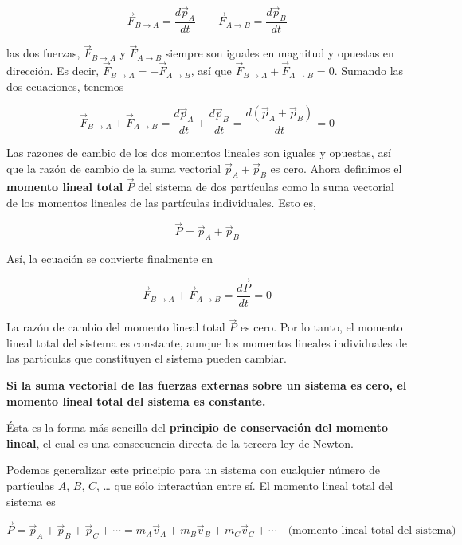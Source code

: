 \documentclass{article}
\newcommand{\bl}[1]{\textbf{#1}}
\newcommand{\definicion}[1]{%
    \vspace{0.5cm}
    \begin{definicionbox}
        #1
    \end{definicionbox}
    \vspace{0.5cm}
}
\begin{document}
    \[ \vec{F}_{B \rightarrow A} = \frac{d \vec{p}_A}{dt} \quad\quad \vec{F}_{A \rightarrow B} = \frac{d \vec{p}_B}{dt} \]

    \noindent  las dos fuerzas, $\vec{F}_{B \rightarrow A}$ y $\vec{F}_{A \rightarrow B}$ siempre son iguales en magnitud y opuestas en dirección. Es decir, $\vec{F}_{B \rightarrow A} = - \vec{F}_{A \rightarrow B} $, así que $\vec{F}_{B \rightarrow A} + \vec{F}_{A \rightarrow B} = 0$. Sumando las dos ecuaciones, tenemos

    \[ \vec{F}_{B \rightarrow A} + \vec{F}_{A \rightarrow B} = \frac{d \vec{p}_A}{dt} + \frac{d \vec{p}_B}{dt} = \frac{d (\vec{p}_A + \vec{p}_B)}{dt} = 0 \]

    \par Las razones de cambio de los dos momentos lineales son iguales y opuestas, así que la razón de cambio de la suma vectorial $\vec{p}_A + \vec{p}_B$ es cero. Ahora definimos el \bl{momento lineal total} $\vec{P}$ del sistema de dos partículas como la suma vectorial de los momentos lineales de las partículas individuales. Esto es,

    \[ \vec{P} = \vec{p}_A + \vec{p}_B \]

    \par Así, la ecuación se convierte ﬁnalmente en

    \[ \vec{F}_{B \rightarrow A} + \vec{F}_{A \rightarrow B} = \frac{d \vec{P}}{dt} = 0 \]

    \par La razón de cambio del momento lineal total $\vec{P}$ es cero. Por lo tanto, el momento lineal total del sistema es constante, aunque los momentos lineales individuales de las partículas que constituyen el sistema pueden cambiar.

    \definicion{
        \par \bl{Si la suma vectorial de las fuerzas externas sobre un sistema es cero, el momento lineal total del sistema es constante.}
    }

    \par Ésta es la forma más sencilla del \bl{principio de conservación del momento lineal}, el cual es una consecuencia directa de la tercera ley de Newton.
    \par Podemos generalizar este principio para un sistema con cualquier número de partículas $A$, $B$, $C$, … que sólo interactúan entre sí. El momento lineal total del sistema es

    \[ \vec{P} = \vec{p}_A + \vec{p}_B + \vec{p}_C + \cdots = m_A \vec{v}_A + m_B \vec{v}_B + m_C \vec{v}_C + \cdots \quad \text{(momento lineal total del sistema)} \]
\end{document}
